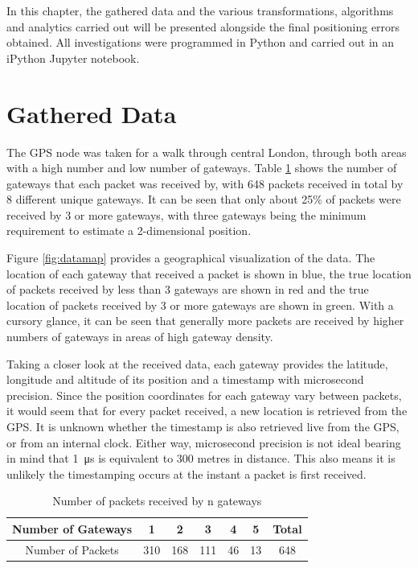 \documentclass[a4paper]{report}
\begin{document}
  In this chapter, the gathered data and the various transformations, algorithms and analytics carried out will be presented alongside the final positioning errors obtained. All investigations were programmed in Python and carried out in an iPython Jupyter notebook.

  \section{Gathered Data}

    The GPS node was taken for a walk through central London, through both areas with a high number and low number of gateways. Table \ref{tab:gatewaynums} shows the number of gateways that each packet was received by, with 648 packets received in total by 8 different unique gateways. It can be seen that only about 25\% of packets were received by 3 or more gateways, with three gateways being the minimum requirement to estimate a 2-dimensional position.

    Figure \ref{fig:datamap} provides a geographical visualization of the data. The location of each gateway that received a packet is shown in blue, the true location of packets received by less than 3 gateways are shown in red and the true location of packets received by 3 or more gateways are shown in green. With a cursory glance, it can be seen that generally more packets are received by higher numbers of gateways in areas of high gateway density.

    Taking a closer look at the received data, each gateway provides the latitude, longitude and altitude of its position and a timestamp with microsecond precision. Since the position coordinates for each gateway vary between packets, it would seem that for every packet received, a new location is retrieved from the GPS. It is unknown whether the timestamp is also retrieved live from the GPS, or from an internal clock. Either way, microsecond precision is not ideal bearing in mind that \SI{1}{\micro\second} is equivalent to 300 metres in distance. This also means it is unlikely the timestamping occurs at the instant a packet is first received.

    \begin{table}[ht]
      \begin{center}
        \caption{Number of packets received by n gateways}
        \label{tab:gatewaynums}
        \begin{tabular}{|c|c|c|c|c|c|c|}
          \hline
          Number of Gateways & 1 & 2 & 3 & 4 & 5 & Total \\
          \hline
          Number of Packets & 310 & 168 & 111 & 46 & 13 & 648 \\
          \hline
        \end{tabular}
      \end{center}
    \end{table}
\end{document}
